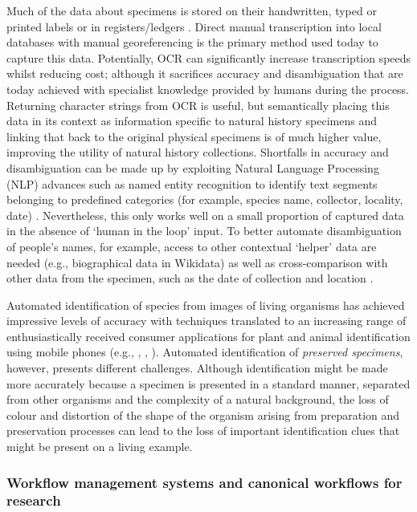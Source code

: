 Much of the data about specimens is stored on their handwritten, typed
or printed labels or in registers/ledgers \cite{ch8-34}. Direct manual
transcription into local databases with manual georeferencing is the
primary method used today to capture this data. Potentially, OCR can
significantly increase transcription speeds whilst reducing cost;
although it sacrifices accuracy and disambiguation that are today
achieved with specialist knowledge provided by humans during the
process. Returning character strings from OCR is useful, but
semantically placing this data in its context as information specific to
natural history specimens and linking that back to the original physical
specimens is of much higher value, improving the utility of natural
history collections. Shortfalls in accuracy and disambiguation can be
made up by exploiting Natural Language Processing (NLP) advances such as
named entity recognition to identify text segments belonging to
predefined categories (for example, species name, collector, locality,
date) \cite{ch8-18}. Nevertheless, this only works well on a small proportion
of captured data in the absence of `human in the loop' input. To better
automate disambiguation of people's names, for example, access to other
contextual `helper' data are needed (e.g., biographical data in
Wikidata) as well as cross-comparison with other data from the specimen,
such as the date of collection and location \cite{ch8-35}.

Automated identification of species from images of living organisms has
achieved impressive levels of accuracy 
\cite{ch8-36,ch8-37,ch8-38,ch8-39,ch8-40,ch8-41} with techniques
translated to an increasing range of enthusiastically received consumer
applications for plant and animal identification using mobile phones
(e.g., ,
,
).
Automated identification of \emph{preserved specimens}, however,
presents different challenges. Although identification might be made
more accurately because a specimen is presented in a standard manner,
separated from other organisms and the complexity of a natural
background, the loss of colour and distortion of the shape of the
organism arising from preparation and preservation processes can lead to
the loss of important identification clues that might be present on a
living example.

\subsubsection{Workflow management systems and canonical workflows
for
research}\label{ch8:workflow-management-systems-and-canonical-workflows-for-research}

